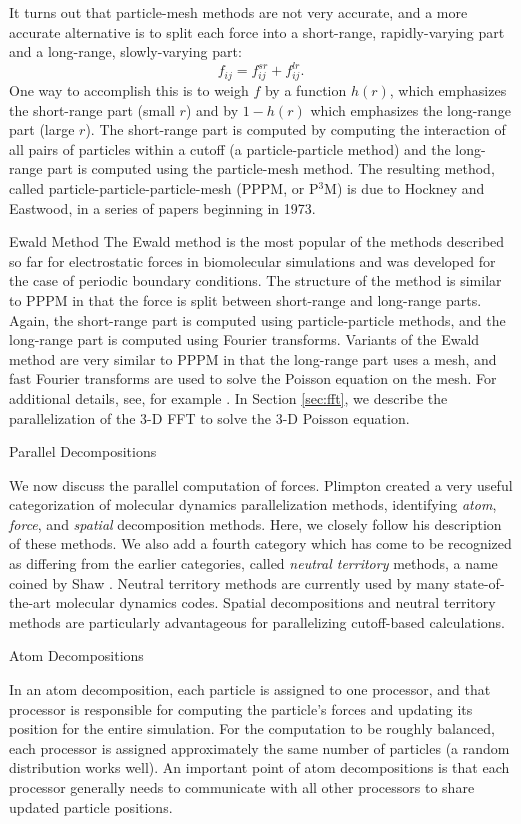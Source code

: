 It turns out that particle-mesh methods are not very accurate,
and a more accurate alternative is to split each force into a short-range,
rapidly-varying part and a long-range, slowly-varying part:
\[
f_{ij} = f_{ij}^{sr} + f_{ij}^{lr} .
\]
One way to accomplish this is to weigh $f$ by a function $h(r)$,
which emphasizes the short-range part (small $r$) and by $1-h(r)$ which
emphasizes the long-range part (large $r$).  The short-range part is
computed by computing the interaction of all pairs of particles
within a cutoff (a particle-particle method) and the long-range part
is computed using the particle-mesh method.  The resulting method,
called particle-particle-particle-mesh (PPPM, or P$^3$M) is due to
Hockney and Eastwood, in a series of papers beginning in 1973.

 {Ewald Method}  
The Ewald method is the most popular of the methods
described so far for electrostatic forces in biomolecular simulations and
was developed for the case of periodic boundary conditions.  The structure
of the method is similar to PPPM in that the force is split
between short-range and long-range parts.  Again, the short-range part is
computed using particle-particle methods, and the long-range part is
computed using Fourier transforms.  Variants of the Ewald method are
very similar to PPPM in that the long-range part uses a mesh, and fast
Fourier transforms are used to solve the Poisson equation on the mesh.
For additional details, see, for example \cite{frenkel-smit}.  
In Section \ref{sec:fft}, we describe the
parallelization of the 3-D FFT to solve the 3-D Poisson equation.

 {Parallel Decompositions}

We now discuss the parallel computation of forces.  Plimpton
\cite{plimpton} created a very useful categorization of molecular dynamics
parallelization methods, identifying {\em atom}, {\em force}, and {\em spatial} 
decomposition
methods.  Here, we closely follow his description of these methods.
We also add a fourth category which has come to be recognized as
differing from the earlier categories, called {\em neutral territory} methods,
a name coined by Shaw \cite{shaw}.  Neutral territory methods are currently
used by many state-of-the-art molecular dynamics codes.
Spatial decompositions and neutral territory methods are particularly
advantageous for parallelizing cutoff-based calculations.

 {Atom Decompositions}

In an atom decomposition, each particle is assigned to one processor,
and that processor is responsible for computing the particle's forces and
updating its position for the entire simulation.  For the computation
to be roughly balanced, each processor is assigned approximately the same
number of particles (a random distribution works well).  An important point
of atom decompositions is that each
processor generally needs to communicate with all other processors to
share updated particle positions.

